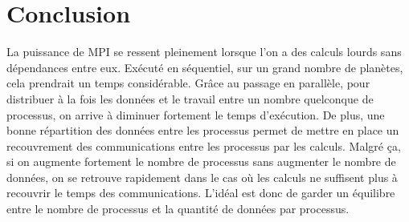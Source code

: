 \documentclass[a4paper,11pt]{article}
\begin{document}
\section{Conclusion}

La puissance de MPI se ressent pleinement lorsque l'on a des calculs lourds sans dépendances entre eux. Exécuté en séquentiel, sur un grand nombre de planètes, cela prendrait un temps considérable. Grâce au passage en parallèle, pour distribuer à la fois les données et le travail entre un nombre quelconque de processus, on arrive à diminuer fortement le temps d'exécution. De plus, une bonne répartition des données entre les processus permet de mettre en place un recouvrement des communications entre les processus par les calculs. Malgré ça, si on augmente fortement le nombre de processus sans augmenter le nombre de données, on se retrouve rapidement dans le cas où les calculs ne suffisent plus à recouvrir le temps des communications. L'idéal est donc de garder un équilibre entre le nombre de processus et la quantité de données par processus.
\end{document}

